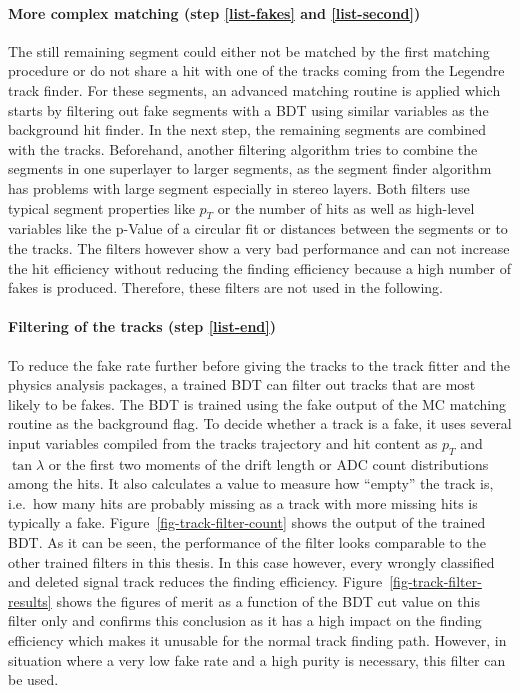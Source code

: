 \paragraph{More complex matching (step \ref{list-fakes} and \ref{list-second})}
The still remaining segment could either not be matched by the first matching procedure or do not share a hit with one of the tracks coming from the Legendre track finder. For these segments, an advanced matching routine is applied which starts by filtering out fake segments with a BDT using similar variables as the background hit finder. In the next step, the remaining segments are combined with the tracks. Beforehand, another filtering algorithm tries to combine the segments in one superlayer to larger segments, as the segment finder algorithm has problems with large segment especially in stereo layers. Both filters use typical segment properties like $p_T$ or the number of hits as well as high-level variables like the p-Value of a circular fit or distances between the segments or to the tracks. The filters however show a very bad performance and can not increase the hit efficiency without reducing the finding efficiency because a high number of fakes is produced. Therefore, these filters are not used in the following. 

\paragraph{Filtering of the tracks (step \ref{list-end})}
To reduce the fake rate further before giving the tracks to the track fitter and the physics analysis packages, a trained BDT can filter out tracks that are most likely to be fakes. The BDT is trained using the fake output of the MC matching routine as the background flag. To decide whether a track is a fake, it uses several input variables compiled from the tracks trajectory and hit content as $p_T$ and $\tan \lambda$ or the first two moments of the drift length or ADC count distributions among the hits. It also calculates a value to measure how ``empty'' the track is, i.e.\ how many hits are probably missing as a track with more missing hits is typically a fake. Figure~\ref{fig-track-filter-count} shows the output of the trained BDT. As it can be seen, the performance of the filter looks comparable to the other trained filters in this thesis. In this case however, every wrongly classified and deleted signal track reduces the finding efficiency. Figure~\ref{fig-track-filter-results} shows the figures of merit as a function of the BDT cut value on this filter only and confirms this conclusion as it has a high impact on the finding efficiency which makes it unusable for the normal track finding path. However, in situation where a very low fake rate and a high purity is necessary, this filter can be used.

